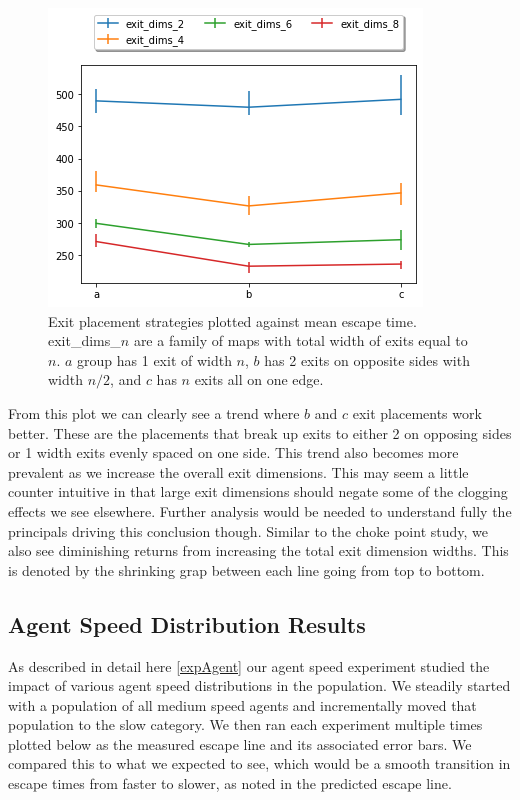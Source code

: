 \documentclass[12pt,letterpaper]{article}
\begin{document}
\begin{figure} [H]
  \centering
  \includegraphics[width=.75\linewidth]{./figures/exit_dims_graph.png}
  \caption{Exit placement strategies plotted against mean escape time.  exit\_dims\_$n$ are a family of maps with total width of exits equal to $n$. $a$ group has 1 exit of width $n$, $b$ has 2 exits on opposite sides with width $n/2$, and $c$ has $n$ exits all on one edge.}
  \label{fig:exitdimsResults}
\end{figure}

From this plot we can clearly see a trend where $b$ and $c$ exit placements work better.  These are the placements that break up exits to either 2 on opposing sides or 1 width exits evenly spaced on one side.  This trend also becomes more prevalent as we increase the overall exit dimensions. This may seem a little counter intuitive in that large exit dimensions should negate some of the clogging effects we see elsewhere.  Further analysis would be needed to understand fully the principals driving this conclusion though.  Similar to the choke point study, we also see diminishing returns from increasing the total exit dimension widths.  This is denoted by the shrinking grap between each line going from top to bottom.

\subsection{Agent Speed Distribution Results}

As described in detail here \ref{expAgent} our agent speed experiment studied the impact of various agent speed distributions in the population.  We steadily started with a population of all medium speed agents and incrementally moved that population to the slow category.  We then ran each experiment multiple times plotted below as the measured escape line and its associated error bars.  We compared this to what we expected to see, which would be a smooth transition in escape times from faster to slower, as noted in the predicted escape line.
\end{document}
